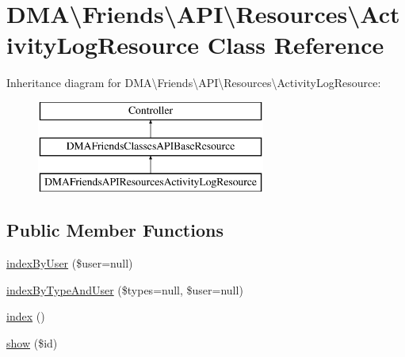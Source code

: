 \hypertarget{classDMA_1_1Friends_1_1API_1_1Resources_1_1ActivityLogResource}{}\section{D\+M\+A\textbackslash{}Friends\textbackslash{}A\+P\+I\textbackslash{}Resources\textbackslash{}Activity\+Log\+Resource Class Reference}
\label{classDMA_1_1Friends_1_1API_1_1Resources_1_1ActivityLogResource}
Inheritance diagram for D\+M\+A\textbackslash{}Friends\textbackslash{}A\+P\+I\textbackslash{}Resources\textbackslash{}Activity\+Log\+Resource\+:\begin{figure}[H]
\begin{center}
\leavevmode
\includegraphics[height=3.000000cm]{d3/d22/classDMA_1_1Friends_1_1API_1_1Resources_1_1ActivityLogResource}
\end{center}
\end{figure}
\subsection*{Public Member Functions}
\begin{DoxyCompactItemize}
\item 
\hyperlink{classDMA_1_1Friends_1_1API_1_1Resources_1_1ActivityLogResource_ab093e778e404042eac0e06e0d8148a49}{index\+By\+User} (\$user=null)
\item 
\hyperlink{classDMA_1_1Friends_1_1API_1_1Resources_1_1ActivityLogResource_a34b4b73d1baf95a90e7337e32385fe07}{index\+By\+Type\+And\+User} (\$types=null, \$user=null)
\item 
\hyperlink{classDMA_1_1Friends_1_1API_1_1Resources_1_1ActivityLogResource_af38f991823e103bbc4fb08fca933bec4}{index} ()
\item 
\hyperlink{classDMA_1_1Friends_1_1API_1_1Resources_1_1ActivityLogResource_a3bf28501723757f40d2ede0bf3565fbd}{show} (\$id)
\end{DoxyCompactItemize}

